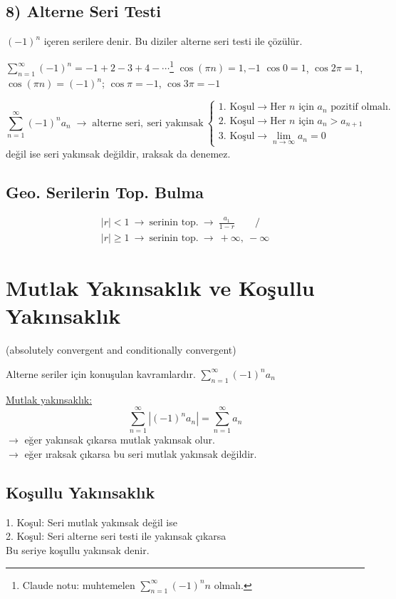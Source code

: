 \documentclass[11pt,a4paper]{article}
\begin{document}
\subsection{8) Alterne Seri Testi}
$(-1)^n$ içeren serilere denir. Bu diziler alterne seri testi ile çözülür.

$\displaystyle\sum_{n=1}^{\infty}(-1)^n=-1+2-3+4-\cdots$\footnote{Claude notu: muhtemelen $\sum_{n=1}^{\infty}(-1)^n n$ olmalı.} \qquad $\cos(\pi n)=1,-1$ \qquad $\cos0=1$, $\cos2\pi=1$, $\cos(\pi n)=(-1)^n$; $\cos\pi=-1$, $\cos3\pi=-1$

\[ \sum_{n=1}^{\infty}(-1)^n a_n \;\to\; \text{alterne seri},\ \text{seri yakınsak}\ \begin{cases}\text{1. Koşul}\to\text{Her $n$ için $a_n$ pozitif olmalı.}\\ \text{2. Koşul}\to\text{Her $n$ için $a_n>a_{n+1}$}\\ \text{3. Koşul}\to\displaystyle\lim_{n\to\infty}a_n=0\end{cases} \]
değil ise seri yakınsak değildir, ıraksak da denemez.

\subsection{Geo. Serilerin Top. Bulma}
\begin{gather*}
|r|<1\ \to\ \text{serinin top.}\ \to\ \frac{a_1}{1-r}\qquad /\\
|r|\ge1\ \to\ \text{serinin top.}\ \to\ +\infty,\ -\infty
\end{gather*}

\section{Mutlak Yakınsaklık ve Koşullu Yakınsaklık}
(absolutely convergent and conditionally convergent)

Alterne seriler için konuşulan kavramlardır. $\displaystyle\sum_{n=1}^{\infty}(-1)^n a_n$

\underline{Mutlak yakınsaklık:}
\[ \sum_{n=1}^{\infty}\left|(-1)^n a_n\right|=\sum_{n=1}^{\infty}a_n \]
$\to$ eğer yakınsak çıkarsa mutlak yakınsak olur.\\
$\to$ eğer ıraksak çıkarsa bu seri mutlak yakınsak değildir.

\subsection{Koşullu Yakınsaklık}
1. Koşul: Seri mutlak yakınsak değil ise\\
2. Koşul: Seri alterne seri testi ile yakınsak çıkarsa\\
Bu seriye koşullu yakınsak denir.
\end{document}

